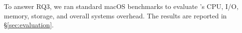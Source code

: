 To answer RQ3, we ran standard macOS benchmarks to evaluate \xxx's CPU,
I/O, memory, storage, and overall systems overhead.  The results are
reported in \S\ref{sec:evaluation}.


